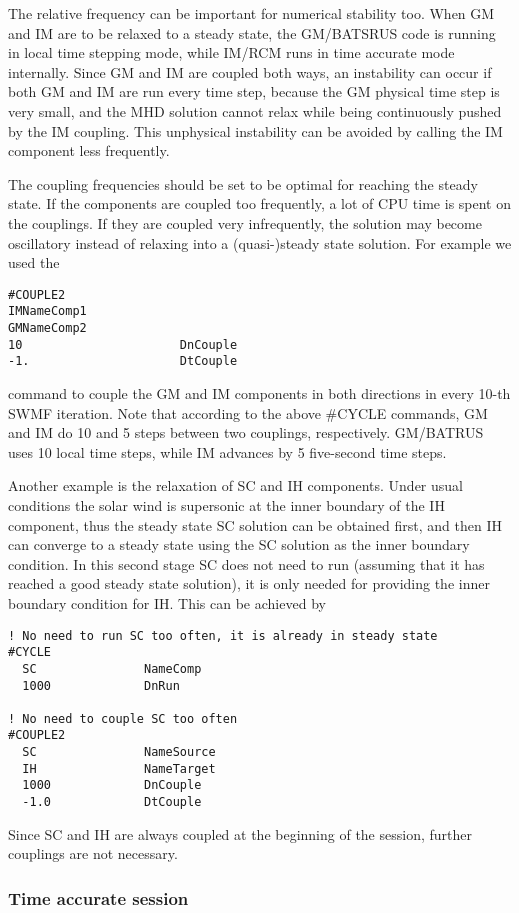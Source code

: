 The relative frequency can be important for numerical
stability too. When GM and IM are to be relaxed
to a steady state, the GM/BATSRUS code is running in 
local time stepping mode, while IM/RCM runs in time 
accurate mode internally. Since GM and IM are coupled
both ways, an instability can occur if both GM and IM
are run every time step, because the GM physical time
step is very small, and the MHD solution cannot relax
while being continuously pushed by the IM coupling.
This unphysical instability can be avoided by calling the
IM component less frequently.

The coupling frequencies should be set to be optimal
for reaching the steady state. If the components are
coupled too frequently, a lot of CPU time is spent
on the couplings. If they are coupled very infrequently,
the solution may become oscillatory instead of relaxing
into a (quasi-)steady state solution. For example
we used the
\begin{verbatim}
#COUPLE2
IMNameComp1
GMNameComp2
10                      DnCouple
-1.                     DtCouple
\end{verbatim}
command to couple the GM and IM components in both directions
in every 10-th SWMF iteration.
Note that according to the above \#CYCLE commands,
GM and IM do 10 and 5 steps between two couplings,
respectively. GM/BATRUS uses 10 local time steps,
while IM advances by 5 five-second time steps.

Another example is the relaxation of SC and IH components.
Under usual conditions the solar wind is supersonic at the 
inner boundary of the IH component, thus the steady state SC
solution can be obtained first, and then IH can converge
to a steady state using the SC solution as the inner boundary 
condition. In this second stage SC does not need to run
(assuming that it has reached a good steady state solution),
it is only needed for providing the inner boundary condition for IH.
This can be achieved by
\begin{verbatim}
! No need to run SC too often, it is already in steady state
#CYCLE
  SC               NameComp
  1000             DnRun

! No need to couple SC too often
#COUPLE2
  SC               NameSource
  IH               NameTarget
  1000             DnCouple
  -1.0             DtCouple
\end{verbatim}
Since SC and IH are always coupled at the beginning of the session,
further couplings are not necessary.

\subsubsection{Time accurate session}

